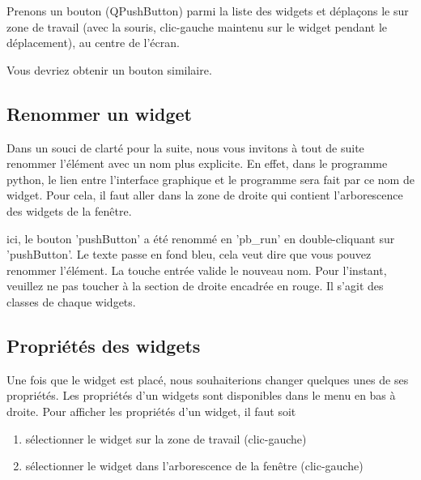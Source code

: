 \documentclass[12pt]{report}    %
\begin{document}
Prenons un bouton (QPushButton) parmi la {\color{green}liste des widgets} et déplaçons le sur {\color{blue}zone de travail} (avec la souris, clic-gauche maintenu sur le widget pendant le déplacement), au centre de l'écran.




Vous devriez obtenir un bouton similaire. \newline



\subsection{Renommer un widget}

Dans un souci de clarté pour la suite, nous vous invitons à tout de suite renommer l'élément avec un nom plus explicite. \newline
{\color{red}En effet, dans le programme python, le lien entre l'interface graphique et le programme sera fait par ce nom de widget.} \newline 
Pour cela, il faut aller dans la zone de droite qui contient l'arborescence des widgets de la fenêtre.



ici, le bouton 'pushButton' a été renommé en 'pb\_run' en double-cliquant sur 'pushButton'. Le texte passe en fond bleu, cela veut dire que vous pouvez renommer l'élément. La touche entrée valide le nouveau nom. \newline
Pour l'instant, veuillez ne pas toucher à la section de droite encadrée en rouge. Il s'agit des classes de chaque widgets. 



\subsection{Propriétés des widgets}

Une fois que le widget est placé, nous souhaiterions changer quelques unes de ses propriétés. \newline
Les propriétés d'un widgets sont disponibles dans le menu en bas à droite.
Pour afficher les propriétés d'un widget, il faut soit
\begin{enumerate}
    \item sélectionner le widget sur la zone de travail (clic-gauche)
    \item sélectionner le widget dans l'arborescence de la fenêtre (clic-gauche)
\end{enumerate}
\end{document}
